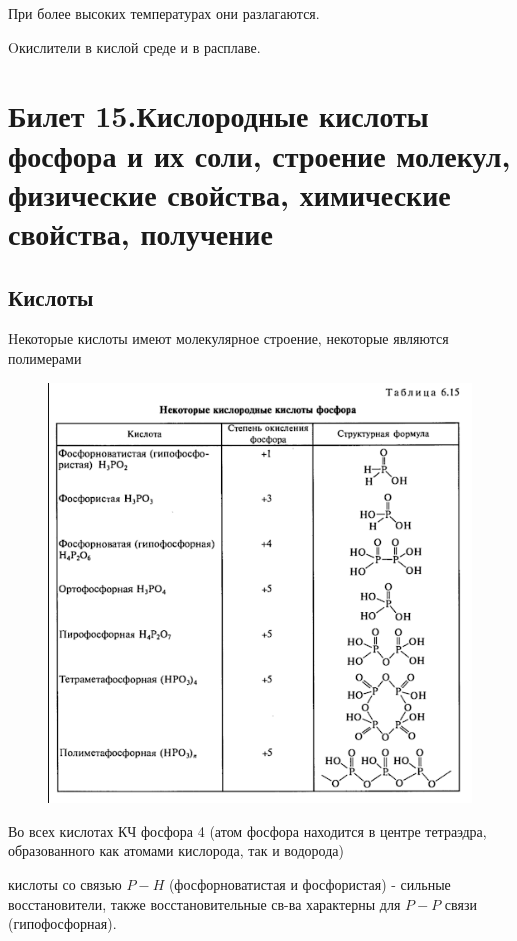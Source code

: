 \documentclass[11pt]{article}
\begin{document}
При более высоких температурах они разлагаются.

Oкислители в кислой среде и в расплаве.










\section{Билет 15.Кислородные кислоты фосфора и их соли, строение молекул, физические свойства, химические свойства, получение}
\subsection{Кислоты}
Hекоторые кислоты имеют молекулярное строение, некоторые являются полимерами

\begin{figure}[htp]
\centering
\includegraphics[scale=0.600]{pacids.png}
\caption{}
\label{}
\end{figure} 

Во всех кислотах КЧ фосфора 4 (атом фосфора находится в центре тетраэдра, образованного как атомами кислорода, так и водорода) 

кислоты со связью $P-H$ (фосфорноватистая и фосфористая) - сильные восстановители, также восстановительные св-ва характерны для $P-P$ связи (гипофосфорная).
\end{document}
